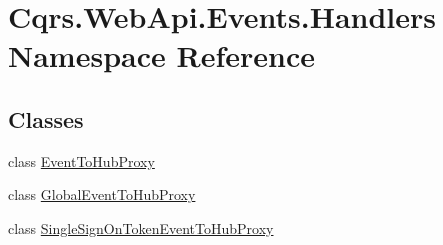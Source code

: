 \hypertarget{namespaceCqrs_1_1WebApi_1_1Events_1_1Handlers}{}\section{Cqrs.\+Web\+Api.\+Events.\+Handlers Namespace Reference}
\label{namespaceCqrs_1_1WebApi_1_1Events_1_1Handlers}
\subsection*{Classes}
\begin{DoxyCompactItemize}
\item 
class \hyperlink{classCqrs_1_1WebApi_1_1Events_1_1Handlers_1_1EventToHubProxy}{Event\+To\+Hub\+Proxy}
\item 
class \hyperlink{classCqrs_1_1WebApi_1_1Events_1_1Handlers_1_1GlobalEventToHubProxy}{Global\+Event\+To\+Hub\+Proxy}
\item 
class \hyperlink{classCqrs_1_1WebApi_1_1Events_1_1Handlers_1_1SingleSignOnTokenEventToHubProxy}{Single\+Sign\+On\+Token\+Event\+To\+Hub\+Proxy}
\end{DoxyCompactItemize}
